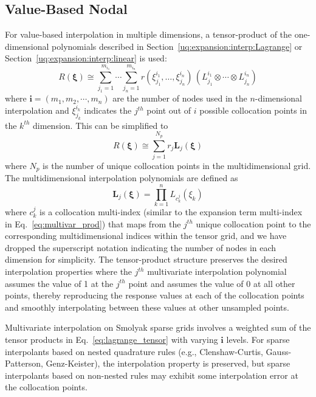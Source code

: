 \subsection{Value-Based Nodal} \label{uq:expansion:sc:value}

For value-based interpolation in multiple dimensions, a tensor-product
of the one-dimensional polynomials described in
Section~\ref{uq:expansion:interp:Lagrange} or
Section~\ref{uq:expansion:interp:linear} is used:
\begin{equation}
R(\boldsymbol{\xi}) \cong \sum_{j_1=1}^{m_{i_1}}\cdots\sum_{j_n=1}^{m_{i_n}}
r\left(\xi^{i_1}_{j_1},\dots , \xi^{i_n}_{j_n}\right)\,
\left(L^{i_1}_{j_1}\otimes\cdots\otimes L^{i_n}_{j_n}\right)
\label{eq:lagrange_tensor}
\end{equation}
where $\boldsymbol{i} = (m_1, m_2, \cdots, m_n)$ are the number of
nodes used in the $n$-dimensional interpolation and $\xi_{j_k}^{i_k}$ 
indicates the $j^{th}$ point out of $i$ possible collocation points 
in the $k^{th}$ dimension.  This can be simplified to
\begin{equation}
R(\boldsymbol{\xi}) \cong \sum_{j=1}^{N_p} r_j \boldsymbol{L}_j(\boldsymbol{\xi})
\label{eq:lagrange_interp_nd}
\end{equation}
where $N_p$ is the number of unique collocation points in the
multidimensional grid.  The multidimensional interpolation polynomials
are defined as
\begin{equation}
\boldsymbol{L}_j(\boldsymbol{\xi}) = \prod_{k=1}^{n} L_{c_k^j}(\xi_k) 
\label{eq:multivar_L}
\end{equation}
where $c_k^j$ is a collocation multi-index (similar to the expansion
term multi-index in Eq.~\ref{eq:multivar_prod}) that maps from the
$j^{th}$ unique collocation point to the corresponding
multidimensional indices within the tensor grid, and we have dropped
the superscript notation indicating the number of nodes in each
dimension for simplicity.  The tensor-product structure preserves the
desired interpolation properties where the $j^{th}$ multivariate
interpolation polynomial assumes the value of 1 at the $j^{th}$ point
and assumes the value of 0 at all other points, thereby reproducing
the response values at each of the collocation points and smoothly
interpolating between these values at other unsampled points.

Multivariate interpolation on Smolyak sparse grids involves a weighted
sum of the tensor products in Eq.~\ref{eq:lagrange_tensor} with
varying $\boldsymbol{i}$ levels.  For sparse interpolants based on
nested quadrature rules (e.g., Clenshaw-Curtis, Gauss-Patterson,
Genz-Keister), the interpolation property is preserved, but sparse
interpolants based on non-nested rules may exhibit some interpolation
error at the collocation points.

